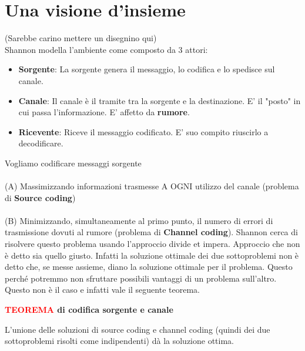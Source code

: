 \documentclass{article}
\begin{document}
    \section{Una visione d'insieme}
    (Sarebbe carino mettere un disegnino qui)\\
    Shannon modella l'ambiente come composto da 3 attori:
    \begin{itemize}
        \item \textbf{Sorgente}: La sorgente genera il messaggio, lo codifica e lo spedisce sul canale.
        \item \textbf{Canale}: Il canale è il tramite tra la sorgente e la destinazione. E' il "posto" in cui passa l'informazione. E' affetto da \textbf{rumore}.
        \item \textbf{Ricevente}: Riceve il messaggio codificato. E' suo compito riuscirlo a decodificare.
    \end{itemize}
    \vspace{10px}
    Vogliamo codificare messaggi sorgente \\ \\ (A) Massimizzando informazioni trasmesse A OGNI utilizzo del canale (problema di \textbf{Source coding}) \\ \\ (B) Minimizzando, simultaneamente al primo punto, il numero di errori di trasmissione dovuti al rumore (problema di \textbf{Channel coding}).
    \vspace{5px}
    Shannon cerca di risolvere questo problema usando l'approccio divide et impera. Approccio che non è detto sia quello giusto. Infatti la soluzione ottimale dei due sottoproblemi non è detto che, se messe assieme, diano la soluzione ottimale per il problema. Questo perché potremmo non sfruttare possibili vantaggi di un problema sull'altro.\\
    Questo non è il caso e infatti vale il seguente teorema.
    \vspace{5px}
    \begin{tcolorbox}
        \textbf{\textcolor{red}{TEOREMA} di codifica sorgente e canale}
        \vspace{5px}
        \begin{center}
            L'unione delle soluzioni di source coding e channel coding (quindi dei due sottoproblemi risolti come indipendenti) dà la soluzione ottima.
        \end{center}
    \end{tcolorbox}
\end{document}
